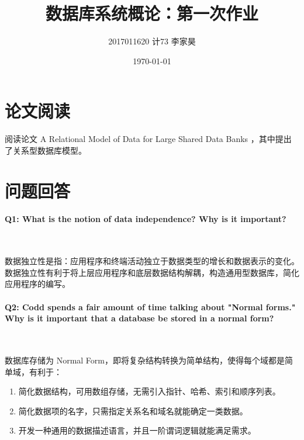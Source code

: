 \documentclass[12pt,a4paper]{article}
\title{数据库系统概论：第一次作业}
\author{2017011620 计73 李家昊}
\date{\today}
\begin{document}
\maketitle

\section{论文阅读}

阅读论文 A Relational Model of Data for Large Shared Data Banks \cite{codd2002relational}，其中提出了关系型数据库模型。

\section{问题回答}

\paragraph{Q1: What is the notion of data independence? Why is it important?}~{}

数据独立性是指：应用程序和终端活动独立于数据类型的增长和数据表示的变化。数据独立性有利于将上层应用程序和底层数据结构解耦，构造通用型数据库，简化应用程序的编写。

\paragraph{Q2: Codd spends a fair amount of time talking about "Normal forms." Why is it important that a database be stored in a normal form?}~{}

数据库存储为 Normal Form，即将复杂结构转换为简单结构，使得每个域都是简单域，有利于：

\begin{enumerate}
    \item 简化数据结构，可用数组存储，无需引入指针、哈希、索引和顺序列表。
    \item 简化数据项的名字，只需指定关系名和域名就能确定一类数据。
    \item 开发一种通用的数据描述语言，并且一阶谓词逻辑就能满足需求。
\end{enumerate}



\end{document}
